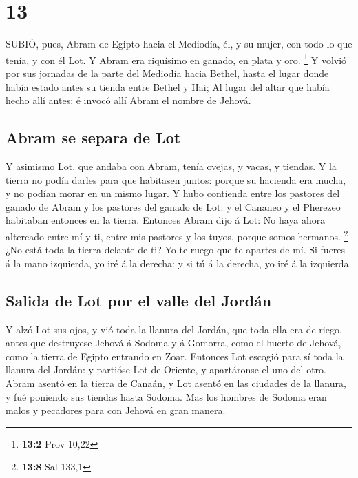 \hypertarget{section-12}{%
\section{13}\label{section-12}}

 SUBIÓ, pues, Abram de Egipto hacia el Mediodía, él, y su
mujer, con todo lo que tenía, y con él Lot.  Y Abram era
riquísimo en ganado, en plata y oro. \footnote{\textbf{13:2} Prov 10,22}
 Y volvió por sus jornadas de la parte del Mediodía hacia
Bethel, hasta el lugar donde había estado antes su tienda entre Bethel y
Hai;  Al lugar del altar que había hecho allí antes: é
invocó allí Abram el nombre de Jehová.

\hypertarget{abram-se-separa-de-lot}{%
\subsection{Abram se separa de Lot}\label{abram-se-separa-de-lot}}

 Y asimismo Lot, que andaba con Abram, tenía ovejas, y
vacas, y tiendas.  Y la tierra no podía darles para que
habitasen juntos: porque su hacienda era mucha, y no podían morar en un
mismo lugar.  Y hubo contienda entre los pastores del ganado
de Abram y los pastores del ganado de Lot: y el Cananeo y el Pherezeo
habitaban entonces en la tierra.  Entonces Abram dijo á Lot:
No haya ahora altercado entre mí y ti, entre mis pastores y los tuyos,
porque somos hermanos. \footnote{\textbf{13:8} Sal 133,1} 
¿No está toda la tierra delante de ti? Yo te ruego que te apartes de mí.
Si fueres á la mano izquierda, yo iré á la derecha: y si tú á la
derecha, yo iré á la izquierda.

\hypertarget{salida-de-lot-por-el-valle-del-jorduxe1n}{%
\subsection{Salida de Lot por el valle del
Jordán}\label{salida-de-lot-por-el-valle-del-jorduxe1n}}

 Y alzó Lot sus ojos, y vió toda la llanura del Jordán, que
toda ella era de riego, antes que destruyese Jehová á Sodoma y á
Gomorra, como el huerto de Jehová, como la tierra de Egipto entrando en
Zoar.  Entonces Lot escogió para sí toda la llanura del
Jordán: y partióse Lot de Oriente, y apartáronse el uno del otro.
 Abram asentó en la tierra de Canaán, y Lot asentó en las
ciudades de la llanura, y fué poniendo sus tiendas hasta Sodoma.
 Mas los hombres de Sodoma eran malos y pecadores para con
Jehová en gran manera.

